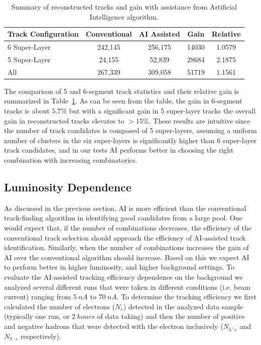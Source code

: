 \documentclass[aps,prl,preprint,12pt]{elsarticle}
\begin{document}
 \begin{table}[!h]
 \begin{center}
 \begin{tabular}{|l|c|c|c|c|}
 \hline
 Track Configuration & Conventional & AI Assisted & Gain & Relative \\
 \hline
 \hline
 6 Super-Layer & 242,145 & 256,175 & 14030 & 1.0579 \\
 5 Super-Layer & 24,155 & 52,839 & 28684 & 2.1875 \\
 All & 267,339 & 309,058 & 51719 & 1.1561 \\
 \hline
 \end{tabular}
 \end{center}
 \caption{Summary of reconstructed tracks and gain with assistance from Artificial Intelligence algorithm.}
 \label{tbl:summary}
 \end{table}
 
The comparison of 5 and 6-segment track statistics and their relative gain is 
summarized in Table~\ref{tbl:summary}. As can be seen from the table, the 
gain in 6-segment tracks is about $5.7\%$ but with a significant gain in 5 super-layer tracks 
the overall gain in reconstructed tracks elevates to $>15\%$. These results are intuitive 
since the number of track candidates is composed of 5 super-layers, assuming a uniform 
number of clusters in the six super-layers is significantly higher than 6 super-layer track 
candidates, and in our tests AI performs better in choosing the right combination with 
increasing combinatorics.
 
\subsection{Luminosity Dependence}

As discussed in the previous section, AI is more efficient than the conventional track-finding 
algorithm in identifying good candidates from a large pool. One would expect that, if the number 
of combinations decreases, the efficiency of the conventional track selection should approach the 
efficiency of AI-assisted track identification. Similarly, when the number of combinations 
increases the gain of AI over the conventional algorithm should increase. Based on this we 
expect AI to perform better in higher luminosity, and higher background settings. To evaluate the 
AI-assisted tracking efficiency dependence on the background we analyzed several different runs 
that were taken in different conditions (i.e. beam current) ranging from $5~nA$ to $70~nA$. 
To determine the tracking efficiency we first calculated the number of electrons ($N_e$) detected 
in the analyzed data sample (typically one run, or $2~hours$ of data taking) and then the number of 
positive and negative hadrons that were detected with the electron inclusively ($N_{h^+e}$ and 
$N_{h^-e}$ respectively).
\end{document}
